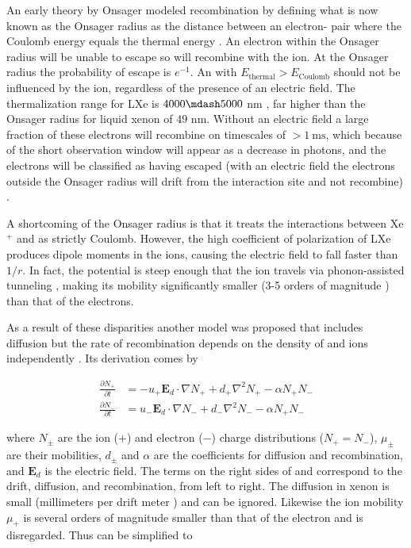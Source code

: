 An early theory by Onsager modeled recombination by defining what is now known as the Onsager radius as the distance between an
electron- pair where the Coulomb energy equals the \electron thermal energy .  An electron within the
Onsager radius will be unable to escape so will recombine with the ion.  At the Onsager radius the probability of escape is $e^{-1}$.  An
\electron
with $E_{\mathrm{thermal}} > E_{\mathrm{Coulomb}}$ should not be influenced by the ion, regardless of the presence of an electric
field.  The thermalization range for LXe is $4000 \mdash 5000$ nm , far higher than the Onsager radius for liquid
xenon of $49$ nm.  Without an electric field a large fraction of these electrons will recombine on
timescales of $> 1\ \mathrm{ms}$, which because of the short observation window will appear as a decrease in photons, and the electrons
will be classified as having escaped (with an electric field the electrons outside the Onsager radius will drift from the interaction site
and not recombine) .

A shortcoming of the Onsager radius is that it treats the interactions between Xe$^{+}$ and \electron as strictly Coulomb.  However,
the high coefficient of polarization of LXe produces dipole moments in the ions, causing the electric field to fall faster than
$1/r$.  In fact, the potential is steep enough that the ion travels via phonon-assisted tunneling , making its
mobility significantly smaller (3-5 orders of magnitude ) than that of the electrons.

As a result of these disparities another model was proposed that includes diffusion but the rate of
recombination depends on
the density of \electron and ions independently .  Its derivation comes by

\begin{subequations}
\begin{align}
\frac{\partial N_{+}}{\partial t} &= -u_{+} \mathbf{E}_d \cdot \nabla N_{+} + d_{+} \nabla^{2} N_{+} - \alpha N_{+} N_{-}
\label{eq:diff_plus} \\
\frac{\partial N_{-}}{\partial t} &= u_{-} \mathbf{E}_d \cdot \nabla N_{-} + d_{-} \nabla^{2} N_{-} - \alpha N_{+} N_{-}
\label{eq:diff_minus}
\end{align}
\label{eq:diff_plus_mins}
\end{subequations}

\noindent where $N_{\pm}$ are the ion ($+$) and electron ($-$) charge distributions ($N_+ = N_-$), $\mu_{\pm}$ are their mobilities,
$d_{\pm}$ and $\alpha$
are the coefficients for diffusion and recombination, and $\mathbf{E}_d$ is the electric field.  The terms on the right sides of
 and  correspond to the drift, diffusion, and recombination, from left to right.  The
diffusion in xenon is small (millimeters per drift meter ) and can be ignored.  Likewise the ion mobility $\mu_{+}$
is several orders of magnitude smaller than that
of the electron and is disregarded.  Thus  can be simplified to

